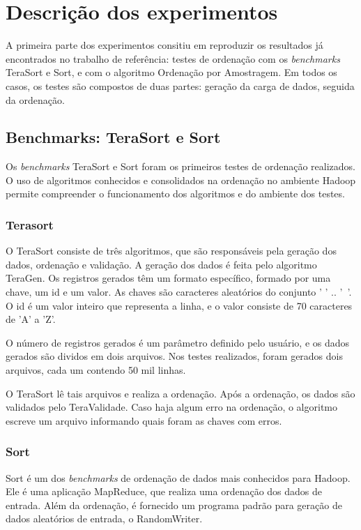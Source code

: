 \section{Descrição dos experimentos}

A primeira parte dos experimentos consitiu em reproduzir os resultados já encontrados no trabalho de referência: testes de ordenação com os \textit{benchmarks} TeraSort e Sort, e com o algoritmo Ordenação por Amostragem. 
Em todos os casos, os testes são compostos de duas partes: geração da carga de dados, seguida da ordenação. 

\subsection{Benchmarks: TeraSort e Sort}

Os \textit{benchmarks} TeraSort e Sort foram os primeiros testes de ordenação realizados. O uso de algoritmos conhecidos e consolidados na ordenação no ambiente Hadoop permite compreender o funcionamento dos algoritmos e do ambiente dos testes.

\subsubsection{Terasort}

O TeraSort consiste de três algoritmos, que são responsáveis pela geração dos dados, ordenação e validação. 
A geração dos dados é feita pelo algoritmo TeraGen. Os registros gerados têm um formato específico, formado por uma chave, um id e um valor. As  chaves são caracteres aleatórios do conjunto ' ' .. '~'. O id é um valor inteiro que representa a linha, e o valor consiste de 70 caracteres de 'A' a 'Z'. 

O número de registros gerados é um parâmetro definido pelo usuário, e os dados gerados são dividos em dois arquivos. Nos testes realizados, foram gerados dois arquivos, cada um contendo 50 mil linhas. 

O TeraSort lê tais arquivos e realiza a ordenação. Após a ordenação, os dados são validados pelo TeraValidade. Caso haja algum erro na ordenação, o algoritmo escreve um arquivo informando quais foram as chaves com erros. 


\subsubsection{Sort}

Sort é um dos \textit{benchmarks}  de ordenação de dados mais conhecidos para Hadoop. Ele é uma aplicação MapReduce, que realiza uma ordenação dos dados de entrada. Além da ordenação, é fornecido um programa padrão para geração de dados aleatórios de entrada, o RandomWriter. 

